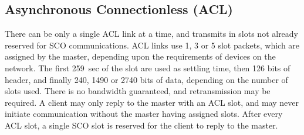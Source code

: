 \subsection*{Asynchronous Connectionless (ACL)}

There can be only a single ACL link at a time, and transmits in slots not already reserved for SCO communications. ACL
 links use 1, 3 or 5 slot packets, which are assigned by the master, depending upon the requirements of devices on the
 network. The first 259~{\textmu}sec of the slot are used as settling time, then 126 bits of header, and finally
 240, 1490 or 2740 bits of data, depending on the number of slots used. There is no bandwidth guaranteed, and
 retransmission may be required. A client may only reply to the master with an ACL slot, and may never initiate
 communication without the master having assigned slots. After every ACL slot, a single SCO slot is reserved for the
 client to reply to the master.